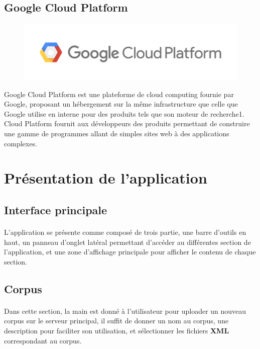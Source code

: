 \documentclass[]{report}
\begin{document}
		\subsection{Google Cloud Platform}
			\paragraph{}
			\begin{figure}[H]
				\centering
				\includegraphics[width=0.35\linewidth]{images/gcp.png}
			\end{figure}
		Google Cloud Platform est une plateforme de cloud computing fournie par Google, proposant un hébergement sur la même infrastructure que celle que Google utilise en interne pour des produits tels que son moteur de recherche1. Cloud Platform fournit aux développeurs des produits permettant de construire une gamme de programmes allant de simples sites web à des applications complexes.
	
	\section{Présentation de l'application}
		\subsection{Interface principale}
			\paragraph{}
			L'application se présente comme composé de trois partie, une barre d'outils en haut, un panneau d'onglet latéral permettant d'accéder au différentes section de l'application, et une zone d'affichage principale pour afficher le contenu de chaque section. 
		\subsection{Corpus}
			\paragraph{}
			Dans cette section, la main est donné à l'utilisateur pour uploader un nouveau corpus sur le serveur principal,  il suffit de donner un nom au corpus, une description pour faciliter son utilisation, et sélectionner les fichiers \textbf{XML} correspondant au corpus.
			
\end{document}
